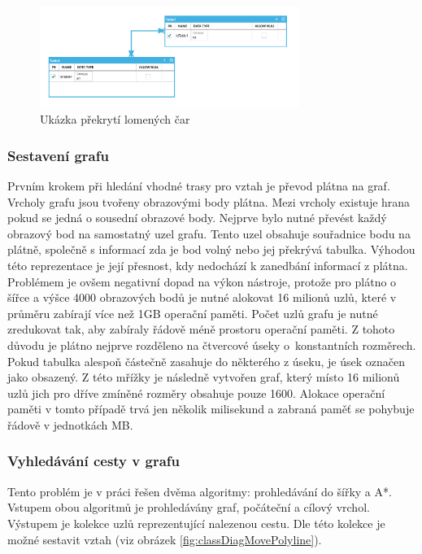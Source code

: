 \documentclass[czech,bachelor,public,dept460,male,oneside]{diploma}
\begin{document}
	\begin{figure}[!h]
		\centering
		\includegraphics[width=0.75\textwidth]{Figures/ScreenLineOverSelf}
		\caption{Ukázka překrytí lomených čar}
		\label{fig:screenLinesOverlay}
	\end{figure}
	
	\subsubsection{Sestavení grafu} \label{secCreateGraph}
	Prvním krokem při hledání vhodné trasy pro vztah je převod plátna na graf. Vrcholy grafu jsou tvořeny obrazovými body plátna. Mezi vrcholy existuje hrana pokud se jedná o sousední obrazové body. Nejprve bylo nutné převést každý obrazový bod na samostatný uzel grafu. Tento uzel obsahuje souřadnice bodu na plátně, společně s informací zda je bod volný nebo jej překrývá tabulka. Výhodou této reprezentace je její přesnost, kdy nedochází k zanedbání informací z plátna. Problémem je ovšem negativní dopad na výkon nástroje, protože pro plátno o šířce a výšce 4000 obrazových bodů je nutné alokovat 16 milionů uzlů, které v průměru zabírají více než 1GB operační paměti. Počet uzlů grafu je nutné zredukovat tak, aby zabíraly řádově méně prostoru operační paměti. Z tohoto důvodu je plátno nejprve rozděleno na čtvercové úseky o~konstantních rozměrech. Pokud tabulka alespoň částečně zasahuje do některého z úseku, je úsek označen jako obsazený. Z této mřížky je následně vytvořen graf, který místo 16 milionů uzlů jich pro dříve zmíněné rozměry obsahuje pouze 1600. Alokace operační paměti v tomto případě trvá jen několik milisekund a zabraná paměť se pohybuje řádově v jednotkách MB.
	
	\subsubsection{Vyhledávání cesty v grafu}
	Tento problém je v práci řešen dvěma algoritmy: prohledávání do šířky a A*. Vstupem obou algoritmů je prohledávány graf, počáteční a cílový vrchol. Výstupem je kolekce uzlů reprezentující nalezenou cestu. Dle této kolekce je možné sestavit vztah (viz obrázek \ref{fig:classDiagMovePolyline}).
	
\end{document}

